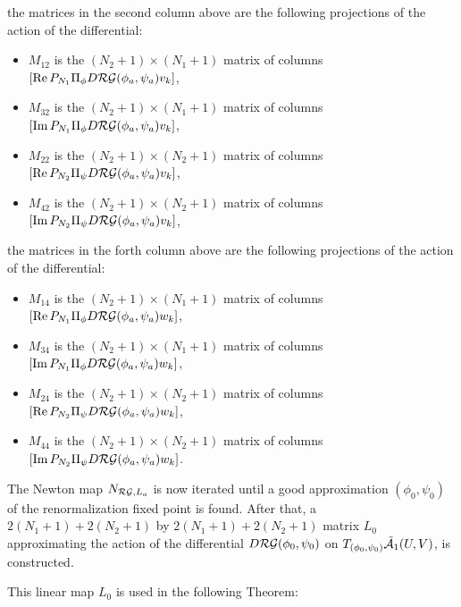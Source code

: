 the matrices in the second column above are  the following projections of the action of the differential:
\begin{itemize}
\item[$\bullet$] $M_{1 2}$ is the $(N_2+1) \times (N_1+1)$ matrix of columns $ \left[ \operatorname{Re} P_{N_1} \Pi_\phi  D \mathcal{RG}(\phi_a,\psi_a) v_k \right]$,
\item[$\bullet$] $M_{3 2}$ is the $(N_2+1) \times (N_1+1)$ matrix of columns $ \left[ \operatorname{Im} P_{N_1} \Pi_\phi  D \mathcal{RG}(\phi_a,\psi_a) v_k \right]$,
\item[$\bullet$] $M_{2 2}$ is the $(N_2+1) \times (N_2+1)$ matrix of columns
$ \left[ \operatorname{Re} P_{N_2} \Pi_\psi  D \mathcal{RG}(\phi_a,\psi_a) v_k \right]$,
\item[$\bullet$] $M_{4 2}$ is the $(N_2+1) \times (N_2+1)$ matrix of columns
$ \left[ \operatorname{Im} P_{N_2} \Pi_\psi  D \mathcal{RG}(\phi_a,\psi_a) v_k \right]$,
\end{itemize}
the matrices in the forth column above are  the following projections of the action of the differential:
\begin{itemize}
\item[$\bullet$] $M_{1 4}$ is the $(N_2+1) \times (N_1+1)$ matrix of columns $ \left[ \operatorname{Re} P_{N_1} \Pi_\phi  D \mathcal{RG}(\phi_a,\psi_a) w_k \right]$,
\item[$\bullet$] $M_{3 4}$ is the $(N_2+1) \times (N_1+1)$ matrix of columns $ \left[ \operatorname{Im} P_{N_1} \Pi_\phi  D \mathcal{RG}(\phi_a,\psi_a) w_k \right]$,
\item[$\bullet$] $M_{2 4}$ is the $(N_2+1) \times (N_2+1)$ matrix of columns
$ \left[ \operatorname{Re} P_{N_2} \Pi_\psi  D \mathcal{RG}(\phi_a,\psi_a) w_k \right]$,
\item[$\bullet$] $M_{4 4}$ is the $(N_2+1) \times (N_2+1)$ matrix of columns
$ \left[ \operatorname{Im} P_{N_2} \Pi_\psi  D \mathcal{RG}(\phi_a,\psi_a) w_k \right]$.
\end{itemize}


The Newton map $N_{\mathcal{RG},L_a}$ is now iterated until a good approximation $(\phi_0,\psi_0)$ of the renormalization fixed point is found. After that, a $2(N_1+1)+2(N_2+1)$ by $2(N_1+1)+2(N_2+1)$ matrix $L_0$ approximating the action of the differential $D \mathcal{RG}(\phi_0,\psi_0)$ on $T_{(\phi_0,\psi_0)} \tilde{\mathcal{A}}_1(U,V)$, is constructed.


This linear map $L_0$ is used in the following Theorem:

